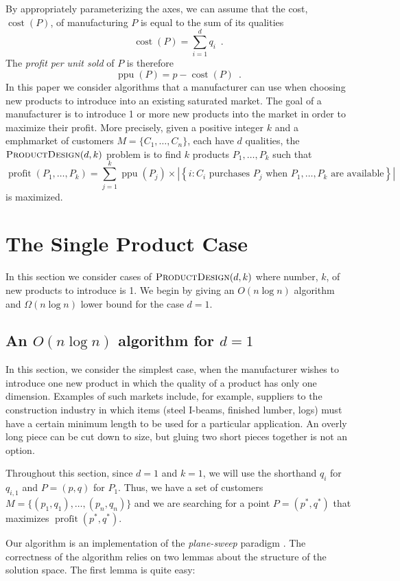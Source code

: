 \documentclass[lotsofwhite]{patmorin}
\newcommand{\cost}{\operatorname{cost}}
\newcommand{\ppu}{\operatorname{ppu}}
\newcommand{\val}{\operatorname{profit}}
\begin{document}
By appropriately parameterizing the axes, we can assume that the cost, 
$\cost(P)$, of manufacturing $P$ is equal to the sum of its qualities
\[
   \cost(P) = \sum_{i=1}^d q_i \enspace .
\]
The \emph{profit per unit sold} of $P$ is therefore
\[
   \ppu(P) = p-\cost(P) \enspace .
\]
In this paper we consider algorithms that a manufacturer can use when
choosing new products to introduce into an existing saturated market.
The goal of a manufacturer is to introduce 1 or more new products into
the market in order to maximize their profit.  More precisely, given
a positive integer $k$ and a emph{market} of customers
$M=\{C_1,\ldots,C_n\}$, each have $d$ qualities,
the $\textsc{ProductDesign}(d,k)$ problem is to find $k$ products $P_1,\ldots,P_k$ such that 
\[
  \val(P_1,\ldots,P_k) = \sum_{j=1}^k \ppu(P_j)
    \times 
      \left|
       \left\{
         i:\mbox{$C_i$ purchases $P_j$ when $P_1,\ldots,P_k$ are available}
       \right\}
      \right|
\]
is maximized.  

\section{The Single Product Case}

In this section we consider cases of $\textsc{ProductDesign}(d,k)$
where number, $k$, of new products to introduce is 1.  We begin by
giving an $O(n\log n)$ algorithm and $\Omega(n\log n)$ lower bound for
the case $d=1$.

\subsection{An $O(n\log n)$ algorithm for $d=1$}

In this section, we consider the simplest case, when the manufacturer
wishes to introduce one new product in which the quality of a product
has only one dimension.  Examples of such markets include, for
example, suppliers to the construction industry in which items (steel
I-beams, finished lumber, logs) must have a certain minimum length to
be used for a particular application.  An overly long piece can be cut
down to size, but gluing two short pieces together is not an option.

Throughout this section, since $d=1$ and $k=1$, we will use the
shorthand $q_i$ for $q_{i,1}$ and $P=(p,q)$ for $P_1$.  Thus, we have
a set of customers $M=\{(p_1,q_1),\ldots,(p_{n},q_n)\}$ and we are
searching for a point $P=(p^*,q^*)$ that maximizes $\val(p^*,q^*)$.

Our algorithm is an implementation of the \emph{plane-sweep} paradigm
\cite{bsXX}.  The correctness of the algorithm relies on two lemmas
about the structure of the solution space.  The first lemma is quite
easy:
\end{document}
